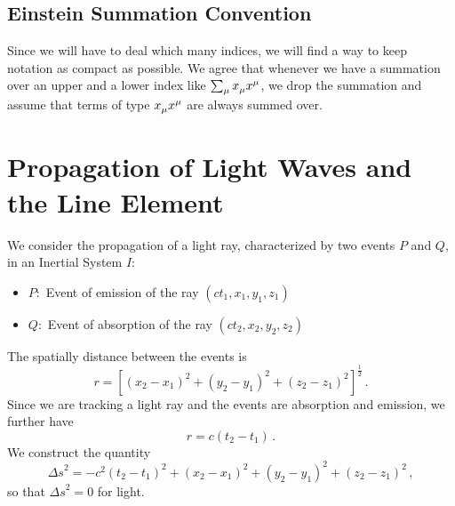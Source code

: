 \subsection{Einstein Summation Convention}
Since we will have to deal which many indices, we will find a way to keep
notation as compact as possible. We agree that whenever we have a summation over an
upper and a lower index like $\sum_\mu \tensor{x}{_\mu}\tensor{x}{^\mu}$, we
drop the summation and assume that terms of type
$\tensor{x}{_\mu}\tensor{x}{^\mu}$ are always summed over.
\section{Propagation of Light Waves and the Line Element}
We consider the propagation of a light ray, characterized by two events $P$ and
$Q$, in an Inertial System $I$:
\begin{itemize}
    \item $P:$ Event of emission of the ray $(ct_1,x_1,y_1,z_1)$
    \item $Q:$ Event of absorption of the ray $(ct_2,x_2,y_2,z_2)$
\end{itemize}
The spatially distance between the events is
\begin{equation}
    r=\left[(x_2-x_1)^2+(y_2-y_1)^2+(z_2-z_1)^2\right]^{\frac{1}{2}}\, .
\end{equation}
Since we are tracking a light ray and the events are absorption and emission, we
further have
\begin{equation}
    r=c(t_2-t_1)\, .
\end{equation}
We construct the quantity
\begin{equation}
    {\Delta s}^2=-c^2(t_2-t_1)^2+(x_2-x_1)^2+(y_2-y_1)^2+(z_2-z_1)^2\, ,
\end{equation}
so that ${\Delta s}^2=0$ for light.

